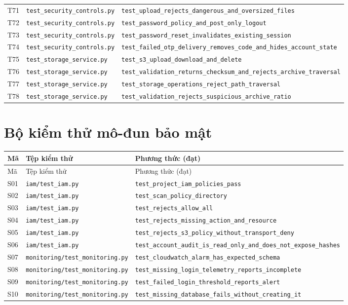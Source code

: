 {\begin{longtable}{P{.8cm}P{4cm}P{8cm}}
T71 & \nolinkurl{test_security_controls.py} & \nolinkurl{test_upload_rejects_dangerous_and_oversized_files} \\
T72 & \nolinkurl{test_security_controls.py} & \nolinkurl{test_password_policy_and_post_only_logout} \\
T73 & \nolinkurl{test_security_controls.py} & \nolinkurl{test_password_reset_invalidates_existing_session} \\
T74 & \nolinkurl{test_security_controls.py} & \nolinkurl{test_failed_otp_delivery_removes_code_and_hides_account_state} \\
T75 & \nolinkurl{test_storage_service.py} & \nolinkurl{test_s3_upload_download_and_delete} \\
T76 & \nolinkurl{test_storage_service.py} & \nolinkurl{test_validation_returns_checksum_and_rejects_archive_traversal} \\
T77 & \nolinkurl{test_storage_service.py} & \nolinkurl{test_storage_operations_reject_path_traversal} \\
T78 & \nolinkurl{test_storage_service.py} & \nolinkurl{test_validation_rejects_suspicious_archive_ratio} \\
\bottomrule
\end{longtable}}
\section{Bộ kiểm thử mô-đun bảo mật}
{\footnotesize
\begin{longtable}{P{.8cm}P{4cm}P{8cm}}
\toprule Mã & Tệp kiểm thử & Phương thức (đạt)\\\midrule\endfirsthead
\toprule Mã & Tệp kiểm thử & Phương thức (đạt)\\\midrule\endhead
S01 & \nolinkurl{iam/test_iam.py} & \nolinkurl{test_project_iam_policies_pass} \\
S02 & \nolinkurl{iam/test_iam.py} & \nolinkurl{test_scan_policy_directory} \\
S03 & \nolinkurl{iam/test_iam.py} & \nolinkurl{test_rejects_allow_all} \\
S04 & \nolinkurl{iam/test_iam.py} & \nolinkurl{test_rejects_missing_action_and_resource} \\
S05 & \nolinkurl{iam/test_iam.py} & \nolinkurl{test_rejects_s3_policy_without_transport_deny} \\
S06 & \nolinkurl{iam/test_iam.py} & \nolinkurl{test_account_audit_is_read_only_and_does_not_expose_hashes} \\
S07 & \nolinkurl{monitoring/test_monitoring.py} & \nolinkurl{test_cloudwatch_alarm_has_expected_schema} \\
S08 & \nolinkurl{monitoring/test_monitoring.py} & \nolinkurl{test_missing_login_telemetry_reports_incomplete} \\
S09 & \nolinkurl{monitoring/test_monitoring.py} & \nolinkurl{test_failed_login_threshold_reports_alert} \\
S10 & \nolinkurl{monitoring/test_monitoring.py} & \nolinkurl{test_missing_database_fails_without_creating_it} \\
\bottomrule
\end{longtable}}
\fi
